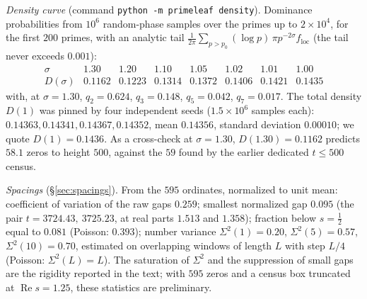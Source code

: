 \documentclass[11pt]{article}
\numberwithin{equation}{section}
\theoremstyle{plain}
\theoremstyle{definition}
\theoremstyle{remark}
\begin{document}
\emph{Density curve} (command \texttt{python -m primeleaf density}). Dominance
probabilities from $10^6$ random-phase samples over the primes up to $2 \times 10^4$,
for the first $200$ primes, with an analytic tail
$\frac{1}{2\pi}\sum_{p > p_0}(\log p)\,\pi p^{-2\sigma} f_{\mathrm{loc}}$ (the tail
never exceeds $0.001$):
\[
\begin{array}{c|ccccccc}
\sigma & 1.30 & 1.20 & 1.10 & 1.05 & 1.02 & 1.01 & 1.00 \\ \hline
D(\sigma) & 0.1162 & 0.1223 & 0.1314 & 0.1372 & 0.1406 & 0.1421 & 0.1435
\end{array}
\]
with, at $\sigma = 1.30$, $q_2 = 0.624$, $q_3 = 0.148$, $q_5 = 0.042$, $q_7 = 0.017$.
The total density $D(1)$ was pinned by four independent seeds ($1.5 \times 10^6$
samples each): $0.14363, 0.14341, 0.14367, 0.14352$, mean $0.14356$, standard
deviation $0.00010$; we quote $D(1) = 0.1436$. As a cross-check at $\sigma = 1.30$,
$D(1.30) = 0.1162$ predicts $58.1$ zeros to height $500$, against the $59$ found by
the earlier dedicated $t \le 500$ census.

\emph{Spacings} (\S\ref{sec:spacings}). From the $595$ ordinates, normalized to unit
mean: coefficient of variation of the raw gaps $0.259$; smallest normalized gap
$0.095$ (the pair $t = 3724.43,\ 3725.23$, at real parts $1.513$ and $1.358$);
fraction below $s = \tfrac12$ equal to $0.081$ (Poisson: $0.393$); number variance
$\Sigma^2(1) = 0.20$, $\Sigma^2(5) = 0.57$, $\Sigma^2(10) = 0.70$, estimated on
overlapping windows of length $L$ with step $L/4$ (Poisson: $\Sigma^2(L) = L$).
The saturation of $\Sigma^2$ and the suppression of small gaps are the rigidity
reported in the text; with $595$ zeros and a census box truncated at
$\operatorname{Re} s = 1.25$, these statistics are preliminary.
\end{document}
